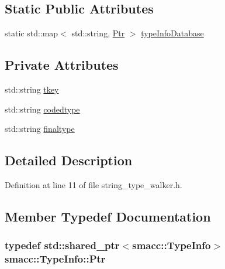 \subsection*{Static Public Attributes}
\begin{DoxyCompactItemize}
\item 
static std\+::map$<$ std\+::string, \hyperlink{classsmacc_1_1TypeInfo_aca0cd51c7c9ef85f6c98dc32878af226}{Ptr} $>$ \hyperlink{classsmacc_1_1TypeInfo_a5dafa5950a93f6cd5b88d5ea573a504c}{type\+Info\+Database}
\end{DoxyCompactItemize}
\subsection*{Private Attributes}
\begin{DoxyCompactItemize}
\item 
std\+::string \hyperlink{classsmacc_1_1TypeInfo_ab61d47adea9dbc8b678e06f627d6b1a3}{tkey}
\item 
std\+::string \hyperlink{classsmacc_1_1TypeInfo_acdd24c44f12bccdaba8d8c52c9e6d47c}{codedtype}
\item 
std\+::string \hyperlink{classsmacc_1_1TypeInfo_ae01f09534a045d2f097a62e9c87cae3d}{finaltype}
\end{DoxyCompactItemize}


\subsection{Detailed Description}


Definition at line 11 of file string\+\_\+type\+\_\+walker.\+h.



\subsection{Member Typedef Documentation}
\subsubsection[{\texorpdfstring{Ptr}{Ptr}}]{\setlength{\rightskip}{0pt plus 5cm}typedef std\+::shared\+\_\+ptr$<${\bf smacc\+::\+Type\+Info}$>$ {\bf smacc\+::\+Type\+Info\+::\+Ptr}}\hypertarget{classsmacc_1_1TypeInfo_aca0cd51c7c9ef85f6c98dc32878af226}{}\label{classsmacc_1_1TypeInfo_aca0cd51c7c9ef85f6c98dc32878af226}


